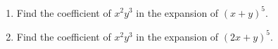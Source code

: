 \begin{enumerate}
\item[(a)] Find the coefficient of $x^2y^3$ in the expansion of $(x+y)^5$.
\item[(b)] Find the coefficient of $x^2y^3$ in the expansion of $(2x+y)^5$.
\end{enumerate}
